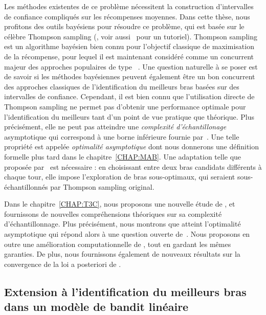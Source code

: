 Les méthodes existentes de ce problème nécessitent la construction d'intervalles de confiance compliqués sur les récompenses moyennes. Dans cette thèse, nous profitons des outils bayésiens pour résoudre ce problème, qui est basée sur le célèbre Thompson sampling (\citealt{thompson1933}, voir aussi~\citealt{russo2018} pour un tutoriel). Thompson sampling est un algorithme bayésien bien connu pour l'objectif classique de maximisation de la récompense, pour lequel il est maintenant considéré comme un concurrent majeur des approches populaires de type \UCB{}~\citep{auer2002ucb}. Une question naturelle à se poser est de savoir si les méthodes bayésiennes peuvent également être un bon concurrent des approches classiques de l'identification du meilleurs bras basées sur des intervalles de confiance. Cependant, il est bien connu que l'utilisation directe de Thompson sampling ne permet pas d'obtenir une performance optimale pour l'identification du meilleurs tant d'un point de vue pratique que théorique. Plus précisément, elle ne peut pas atteindre une \emph{complexité d'échantillonage} asymptotique qui correspond à une borne inférieure fournie par~\cite{garivier2016tracknstop}. Une telle propriété est appelée \emph{optimalité asymptotique} dont nous donnerons une définition formelle plus tard dans le chapitre~\ref{CHAP:MAB}. Une adaptation telle que \TTTS{} proposée par~\cite{russo2016ttts} est nécessaire : en choisissant entre deux bras candidats différents à chaque tour, elle impose l'exploration de bras sous-optimaux, qui seraient sous-échantillonnés par Thompson sampling original. 

Dans le chapitre~\ref{CHAP:T3C}, nous proposons une nouvelle étude de \TTTS{}, et fournissons de nouvelles compréhensions théoriques sur sa complexité d'échantillonnage. Plus précisément, nous montrons que \TTTS{} atteint l'optimalité asymptotique qui répond alors à une question ouverte de~\cite{russo2016ttts}. Nous proposons en outre une amélioration computationnelle \TCC{} de \TTTS{}, tout en gardant les mêmes garanties. De plus, nous fournissons également de nouveaux résultats sur la convergence de la loi a posteriori de \TTTS{}.

\subsection{Extension \`a l'identification du meilleurs bras dans un modèle de bandit linéaire}\label{sec:abs.mab.linear}

